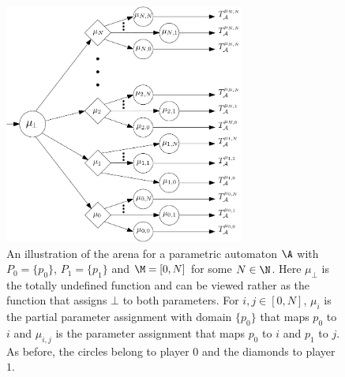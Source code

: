 \begin{center}
	\begin{figure}
		\hspace{2cm}
\includegraphics[width=0.7\textwidth]{figures/parameter_arena}
	\caption{An illustration of the arena for a parametric automaton $\A$ with 
	$P_0 = \{p_0\}$, $P_1 = \{p_1\}$ and
	$\M = [0,N]$ for some $N\in \N$.
	 Here $\mu_\bot$ is 
	the totally undefined function and can be viewed rather as 
	the function that assigns $\bot$ to both parameters. For $i,j \in [0,N]$, $\mu_i$ is the partial parameter assignment with domain $\{p_0\}$ that maps $p_0$ to $i$ and $\mu_{i,j}$ is the parameter assignment that maps $p_0$ to $i$ and $p_1$ to $j$.
	  As before, the circles belong to player $0$ and the diamonds to player $1$.} 
	\label{parametric_arena}
	\end{figure}
\end{center}




